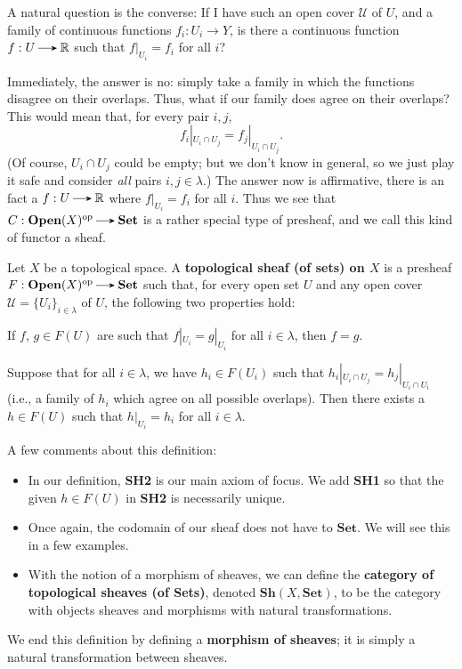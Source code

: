 A natural question is the converse: If I have such an open cover $\mathcal{U}$ of $U$, 
and a family of continuous functions $f_i: U_i \to Y$, is there a continuous 
function $f: U \to \rr$ such that $f|_{U_i} = f_i$ for all $i$? 

Immediately, the answer is no: simply take a family in which the functions disagree on their overlaps. 
Thus, what if our family does agree on their overlaps? This would mean that, for every 
pair $i, j$, 
\[
    f_{i}|_{U_i \cap U_j} = f_j|_{U_i \cap U_j}.
\]
(Of course, $U_i \cap U_j$ could be empty; but we don't know in general, 
so we just play it safe and consider \emph{all} pairs $i, j \in \lambda$.)
The answer now is affirmative, there is an fact a $f: U \to \rr$ where $f|_{U_i} = f_i$ 
for all $i$. 
Thus we see that $C: \textbf{Open}(X)\op \to \textbf{Set}$ is a rather special type 
of presheaf, and we call this kind of functor a sheaf.

\begin{definition}
    Let $X$ be a topological space.
    A \textbf{topological sheaf (of sets) on $X$} is a presheaf 
    $F: \textbf{Open}(X)\op \to \textbf{Set}$ such that, for every open 
    set $U$ and any open cover $\mathcal{U} = \{U_i\}_{i \in \lambda}$ of $U$, 
    the following two properties hold:
    \begin{description}
        \itemsep 0.25cm
        \item[\textbf{(SH1)}]
        If $f$, $g \in F(U)$ are such that $f|_{U_i} = g|_{U_i}$ for all 
        $i \in \lambda$, then $f = g$. 

        \item[\textbf{(SH2)}] 
        Suppose that for all $i \in \lambda$, we have $h_i \in F(U_i)$ 
        such that $h_i|_{U_i \cap U_j} = h_j|_{U_i \cap U_i}$ (i.e., a family 
        of $h_i$ which agree on all possible overlaps). Then there exists a 
        $h \in F(U)$ such that $h|_{U_i} = h_i$ for all $i \in \lambda$. 
    
    \end{description}
    A few comments about this definition:
    \begin{itemize}
        \item In our definition, \textbf{SH2} is our main axiom of focus. We add 
        \textbf{SH1} so that the given $h \in F(U)$ in \textbf{SH2} is necessarily 
        unique.
        \item Once again, the codomain of our sheaf does not have to $\textbf{Set}$. 
        We will see this in a few examples. 
        \item With the notion of a morphism of sheaves, we can define the \textbf{category 
        of topological sheaves (of \textbf{Sets})}, denoted $\textbf{Sh}(X, \textbf{Set})$,
        to be the category with objects sheaves and morphisms with natural transformations.
    \end{itemize}
    We end this definition by defining a \textbf{morphism of sheaves}; it is simply 
    a natural transformation between sheaves. 
\end{definition}

